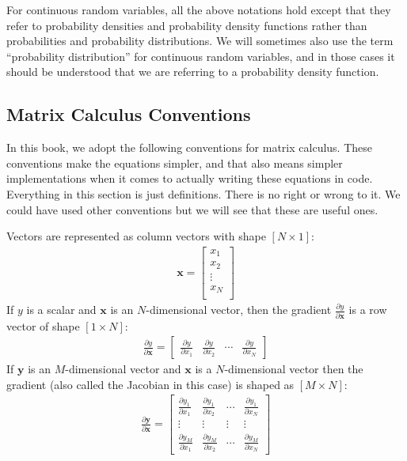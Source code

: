 For continuous random variables, all the above notations hold except that they refer to probability densities and probability density functions rather than probabilities and probability distributions. We will sometimes also use the term ``probability distribution'' for continuous random variables, and in those cases it should be understood that we are referring to a probability density function.


\subsection*{Matrix Calculus Conventions}
\label{appendix:matrix_calc:notational_conventions}

In this book, we adopt the following conventions for matrix calculus. These conventions make the equations simpler, and that also means simpler implementations when it comes to actually writing these equations in code. Everything in this section is just definitions. There is no right or wrong to it. We could have used other conventions but we will see that these are useful ones.

Vectors are represented as column vectors with shape $[N \times 1]$:
\begin{align}
    \mathbf{x} = 
    \begin{bmatrix}
    x_1  \\
    x_2  \\
    \vdots \\
    x_N \\
    \end{bmatrix}
\end{align}
If $y$ is a scalar and $\mathbf{x}$ is an $N$-dimensional vector, then the gradient $\frac{\partial y}{\partial \mathbf{x}}$ is a row vector of shape  $[1 \times N]$:
\begin{align}
    \frac{\partial y}{\partial \mathbf{x}} =  
\begin{bmatrix}
    \frac{\partial y}{\partial x_1} & \frac{\partial y}{\partial x_2} & \cdots & \frac{\partial y}{\partial x_N} \label{backprop:scalar_vector_deriv}
\end{bmatrix}
\end{align}
If $\mathbf{y}$ is an $M$-dimensional vector and $\mathbf{x}$ is a $N$-dimensional vector then the gradient (also called the Jacobian in this case) is shaped as $[M \times N]$:
\begin{align}
\frac{\partial \mathbf{y}}{\partial \mathbf{x}} =  
\begin{bmatrix}
    \frac{\partial y_1}{\partial x_1} & \frac{\partial y_1}{\partial x_2} & \cdots & \frac{\partial y_1}{\partial x_N} \\
    \vdots & \vdots & \vdots & \vdots \\
    \frac{\partial y_M}{\partial x_1} & \frac{\partial y_M}{\partial x_2} & \cdots & \frac{\partial y_M}{\partial x_N}
\end{bmatrix}
\end{align}


